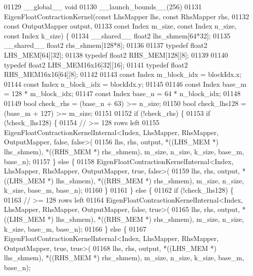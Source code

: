 \begin{DoxyCode}
01129 \_\_global\_\_ \textcolor{keywordtype}{void}
01130 \_\_launch\_bounds\_\_(256)
01131 EigenFloatContractionKernel(const LhsMapper lhs, const RhsMapper rhs,
01132                        const OutputMapper output,
01133                        const Index m\_size, const Index n\_size, const Index k\_size) \{
01134   \_\_shared\_\_ float2 lhs\_shmem[64*32];
01135   \_\_shared\_\_ float2 rhs\_shmem[128*8];
01136 
01137   \textcolor{keyword}{typedef} float2 LHS\_MEM[64][32];
01138   \textcolor{keyword}{typedef} float2 RHS\_MEM[128][8];
01139 
01140   \textcolor{keyword}{typedef} float2 LHS\_MEM16x16[32][16];
01141   \textcolor{keyword}{typedef} float2 RHS\_MEM16x16[64][8];
01142 
01143   \textcolor{keyword}{const} Index m\_block\_idx = blockIdx.x;
01144   \textcolor{keyword}{const} Index n\_block\_idx = blockIdx.y;
01145 
01146   \textcolor{keyword}{const} Index base\_m = 128 * m\_block\_idx;
01147   \textcolor{keyword}{const} Index base\_n = 64 * n\_block\_idx;
01148 
01149   \textcolor{keywordtype}{bool} check\_rhs = (base\_n + 63) >= n\_size;
01150   \textcolor{keywordtype}{bool} check\_lhs128 = (base\_m + 127) >= m\_size;
01151 
01152   \textcolor{keywordflow}{if} (!check\_rhs) \{
01153     \textcolor{keywordflow}{if} (!check\_lhs128) \{
01154       \textcolor{comment}{// >= 128 rows left}
01155       EigenFloatContractionKernelInternal<Index, LhsMapper, RhsMapper, OutputMapper, false, false>(
01156                      lhs, rhs, output, *((LHS\_MEM *) lhs\_shmem), *((RHS\_MEM *) rhs\_shmem), m\_size, n\_size, 
      k\_size, base\_m, base\_n);
01157     \} \textcolor{keywordflow}{else} \{
01158       EigenFloatContractionKernelInternal<Index, LhsMapper, RhsMapper, OutputMapper, true, false>(
01159                      lhs, rhs, output, *((LHS\_MEM *) lhs\_shmem), *((RHS\_MEM *) rhs\_shmem), m\_size, n\_size, 
      k\_size, base\_m, base\_n);
01160     \}
01161   \} \textcolor{keywordflow}{else} \{
01162     \textcolor{keywordflow}{if} (!check\_lhs128) \{
01163       \textcolor{comment}{// >= 128 rows left}
01164       EigenFloatContractionKernelInternal<Index, LhsMapper, RhsMapper, OutputMapper, false, true>(
01165                      lhs, rhs, output, *((LHS\_MEM *) lhs\_shmem), *((RHS\_MEM *) rhs\_shmem), m\_size, n\_size, 
      k\_size, base\_m, base\_n);
01166     \} \textcolor{keywordflow}{else} \{
01167       EigenFloatContractionKernelInternal<Index, LhsMapper, RhsMapper, OutputMapper, true, true>(
01168                      lhs, rhs, output, *((LHS\_MEM *) lhs\_shmem), *((RHS\_MEM *) rhs\_shmem), m\_size, n\_size, 
      k\_size, base\_m, base\_n);

\end{DoxyCode}
